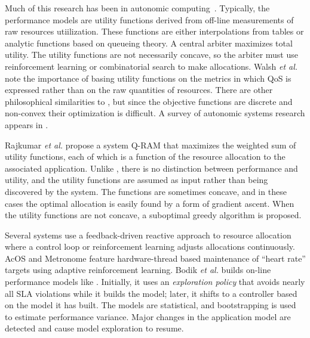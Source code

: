 Much of this research has been in autonomic computing~\cite{1078472,1078493,1285843,1345325}. Typically, the performance models are utility functions derived from off-line measurements of raw resources utiilization. These functions are either interpolations from tables or analytic functions based on queueing theory.
A central arbiter maximizes total utility. The utility functions are not necessarily concave,
so the arbiter must use reinforcement learning or combinatorial search to make allocations.
Walsh \emph{et al.}\cite{1078411} note the importance of basing utility functions
on the metrics in which QoS is expressed rather than on the raw quantities of resources.
There are other philosophical similarities to \pacora, but since the objective functions are discrete and non-convex their optimization is difficult. A survey of autonomic systems research appears in \cite{1380585}.

Rajkumar \emph{et al.}\cite{828990} propose a system Q-RAM that maximizes the weighted sum of utility functions, each of which is a function of the resource allocation to the associated application. Unlike \pacora, there is no distinction between performance and utility, and the utility functions are assumed as input rather than being discovered by the system. The functions are sometimes concave, and in these cases the optimal allocation is easily found by a form of gradient ascent. When the utility functions are not concave, a suboptimal greedy algorithm is proposed.

Several systems use a feedback-driven reactive approach to resource allocation where a control loop or reinforcement learning adjusts allocations continuously. AcOS\cite{AcOS} and Metronome\cite{Metronome} feature hardware-thread based maintenance of ``heart rate'' targets using adaptive reinforcement learning.
Bodik \emph{et al.}\cite{bodik-acdc09} builds on-line performance models like \pacora.
Initially, it uses an \emph{exploration policy} that avoids nearly all SLA violations while it builds the model; later, it shifts to a controller based on the model it has built.
The models are statistical, and bootstrapping is used to estimate performance variance.
Major changes in the application model are detected and cause model exploration to resume.

